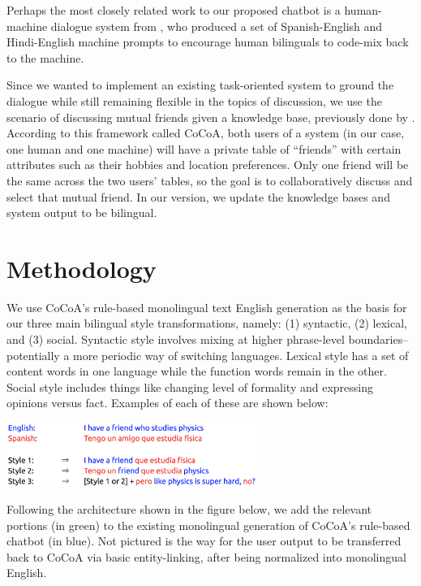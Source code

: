 \documentclass[12pt, letterpaper]{article}
\begin{document}
\begin{multicols*}{2}
Perhaps the most closely related work to our proposed chatbot is a human-machine dialogue system from \citet{Ramanarayanan2017}, who produced a set of Spanish-English and Hindi-English machine prompts to encourage human bilinguals to code-mix back to the machine. 

Since we wanted to implement an existing task-oriented system to ground the dialogue while still remaining flexible in the topics of discussion, we use the scenario of discussing mutual friends given a knowledge base, previously done by \citet{he2017learning}. According to this framework called CoCoA, both users of a system (in our case, one human and one machine) will have a private table of “friends” with certain attributes such as their hobbies and location preferences. Only one friend will be the same across the two users’ tables, so the goal is to collaboratively discuss and select that mutual friend. In our version, we update the knowledge bases and system output to be bilingual.

\section{Methodology}
We use CoCoA's rule-based monolingual text English generation as the basis for our three main bilingual style transformations, namely: (1) syntactic, (2) lexical, and (3) social. Syntactic style involves mixing at higher phrase-level boundaries--potentially a more periodic way of switching languages. Lexical style has a set of content words in one language while the function words remain in the other. Social style includes things like changing level of formality and expressing opinions versus fact. Examples of each of these are shown below:

\vspace{2ex}
\noindent
\includegraphics[width=8.2cm]{style_ex}

Following the architecture shown in the figure below, we add the relevant portions (in green) to the existing monolingual generation of CoCoA’s rule-based chatbot (in blue). Not pictured is the way for the user output to be transferred back to CoCoA via basic entity-linking, after being normalized into monolingual English.


\end{multicols*}
\end{document}

